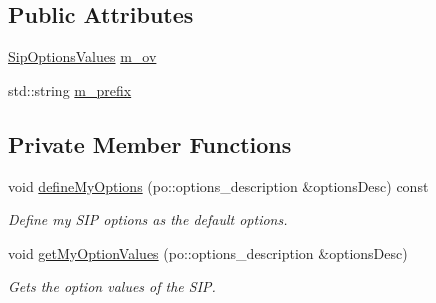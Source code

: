 \subsection*{Public Attributes}
\begin{DoxyCompactItemize}
\item 
\hyperlink{class_q_u_e_s_o_1_1_sip_options_values}{Sip\-Options\-Values} \hyperlink{class_q_u_e_s_o_1_1_statistical_inverse_problem_options_a3f432ce80a98a70c33376bf9a1c4b36c}{m\-\_\-ov}
\item 
std\-::string \hyperlink{class_q_u_e_s_o_1_1_statistical_inverse_problem_options_ad58cf6e7350173ebea80576184a97e2b}{m\-\_\-prefix}
\end{DoxyCompactItemize}
\subsection*{Private Member Functions}
\begin{DoxyCompactItemize}
\item 
void \hyperlink{class_q_u_e_s_o_1_1_statistical_inverse_problem_options_ae085514e9153c131266f93abea2db3dd}{define\-My\-Options} (po\-::options\-\_\-description \&options\-Desc) const 
\begin{DoxyCompactList}\small\item\em Define my S\-I\-P options as the default options. \end{DoxyCompactList}\item 
void \hyperlink{class_q_u_e_s_o_1_1_statistical_inverse_problem_options_a5984ab1857cbe72f9f665388f9e87e5e}{get\-My\-Option\-Values} (po\-::options\-\_\-description \&options\-Desc)
\begin{DoxyCompactList}\small\item\em Gets the option values of the S\-I\-P. \end{DoxyCompactList}\end{DoxyCompactItemize}
